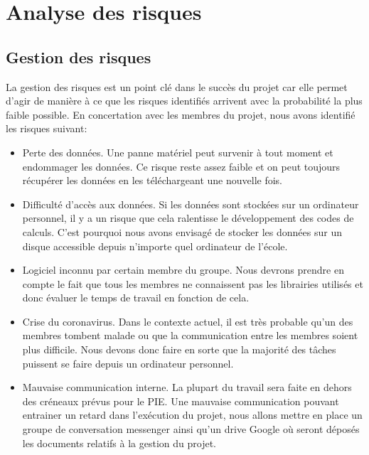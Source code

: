 \chapter*{Analyse des risques}
\label{sec:risques}
\section*{Gestion des risques}
La gestion des risques est un point clé dans le succès du projet car elle permet d'agir de manière à ce que les risques identifiés arrivent avec la probabilité la plus faible possible. En concertation avec les membres du projet, nous avons identifié les risques suivant:

\begin{itemize}
	\item Perte des données. Une panne matériel peut survenir à tout moment et endommager les données. Ce risque reste assez faible et on peut toujours récupérer les données en les téléchargeant une nouvelle fois.
	
	\item Difficulté d'accès aux données. Si les données sont stockées sur un ordinateur personnel, il y a un risque que cela ralentisse le développement des codes de calculs. C'est pourquoi nous avons envisagé de stocker les données sur un disque accessible depuis n'importe quel ordinateur de l'école.
	
	\item Logiciel inconnu par certain membre du groupe. Nous devrons prendre en compte le fait que tous les membres ne connaissent pas les librairies utilisés et donc évaluer le temps de travail en fonction de cela.
	
	\item Crise du coronavirus. Dans le contexte actuel, il est très probable qu'un des membres tombent malade ou que la communication entre les membres soient plus difficile. Nous devons donc faire en sorte que la majorité des tâches puissent se faire depuis un ordinateur personnel.
	
	\item Mauvaise communication interne. La plupart du travail sera faite en dehors des créneaux prévus pour le PIE. Une mauvaise communication pouvant entrainer un retard dans l'exécution du projet, nous allons mettre en place un groupe de conversation messenger ainsi qu'un drive Google où seront déposés les documents relatifs à la gestion du projet.
	
\end{itemize}


